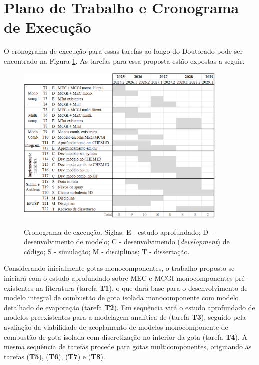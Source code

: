\section{Plano de Trabalho e Cronograma de Execução}

O cronograma de execução para essas tarefas ao longo do Doutorado pode ser encontrado na Figura \ref{fig:cronograma}.
As tarefas para essa proposta estão expostas a seguir.

\begin{figure}[ht]
    \centering
    \caption{Cronograma de execução. Siglas: E - estudo aprofundado; D - desenvolvimento de modelo; C - desenvolvimendo (\emph{development}) de código; S - simulação; M - disciplinas; T - dissertação.}
    \includegraphics[width=0.9\textwidth]{30_images/cronograma-3.png}
    \label{fig:cronograma}
\end{figure}


Considerando inicialmente gotas monocomponentes, o trabalho proposto se iniciará com o estudo aprofundado sobre MEC e MCGI monocomponentes pré-existentes na literatura (tarefa \textbf{T1}), o que dará base para o desenvolvimento de modelo integral de combustão de gota isolada monocomponente com modelo detalhado de evaporação (tarefa \textbf{T2}).
Em sequência virá o estudo aprofundado de modelos preexistentes para a modelagem analítica de   (tarefa \textbf{T3}), seguido pela avaliação da viabilidade de acoplamento de modelos monocomponente de combustão de gota isolada com discretização no interior da gota (tarefa \textbf{T4}).
A mesma sequência de tarefas procede para gotas multicomponentes, originando as tarefas (\textbf{T5}), (\textbf{T6}), (\textbf{T7}) e (\textbf{T8}). 


